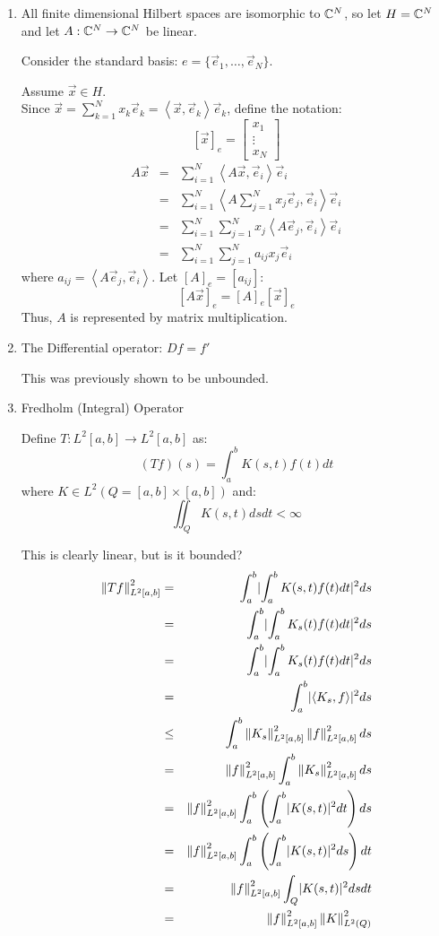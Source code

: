 \documentclass[letterpaper,12pt,fleqn]{article}
\newcommand{\ve}{\vec{e}}
\newcommand{\vx}{\vec{x}}
\newcommand{\norm}[1]{\left\|#1\right\|}
\newcommand{\inner}[1]{\left<#1\right>}
\begin{document}
\begin{examples}
  \listbreak
  \begin{enumerate}
  \item All finite dimensional Hilbert spaces are isomorphic to $\mathbb{C}^N$, so
    let $H=\mathbb{C}^N$ and let $A:\mathbb{C}^N\to\mathbb{C}^N$ be linear.

    Consider the standard basis: $e=\{\ve_1,\ldots,\ve_N\}$.

    Assume $\vx\in H$. \\
    Since $\vx=\sum_{k=1}^Nx_k\ve_k=\inner{\vx,\ve_k}\ve_k$, define the notation:
    \[[\vx]_e=\begin{bmatrix} x_1 \\ \vdots \\ x_N \end{bmatrix}\]
    \begin{eqnarray*}
      A\vx &=& \sum_{i=1}^N\inner{A\vx,\ve_i}\ve_i \\
      &=& \sum_{i=1}^N\inner{A\sum_{j=1}^Nx_j\ve_j,\ve_i}\ve_i \\
      &=& \sum_{i=1}^N\sum_{j=1}^Nx_j\inner{A\ve_j,\ve_i}\ve_i \\
      &=& \sum_{i=1}^N\sum_{j=1}^Na_{ij}x_j\ve_i
    \end{eqnarray*}
    where $a_{ij}=\inner{A\ve_j,\ve_i}$.
    Let $[A]_e=[a_{ij}]$:
    \[[A\vx]_e=[A]_e[\vx]_e\]
    Thus, $A$ is represented by matrix multiplication.

  \item The Differential operator: $Df=f'$

    This was previously shown to be unbounded.

  \item Fredholm (Integral) Operator

    Define $T:L^2[a,b]\to L^2[a,b]$ as:
    \[(Tf)(s)=\int_a^bK(s,t)f(t)dt\]
    where $K\in L^2(Q=[a,b]\times[a,b])$ and:
    \[\iint_QK(s,t)ds dt<\infty\]

    This is clearly linear, but is it bounded?
    \begin{eqnarray*}
      \norm{Tf}_{L^2[a,b]}^2 &=& \int_a^b\abs{\int_a^bK(s,t)f(t)dt}^2ds \\
      &=& \int_a^b\abs{\int_a^bK_s(t)f(t)dt}^2ds \\
      &=& \int_a^b\abs{\int_a^bK_s(t)f(t)dt}^2ds \\
      &=& \int_a^b\abs{\inner{K_s,f}}^2ds \\
      &\le& \int_a^b\norm{K_s}_{L^2[a,b]}^2\norm{f}_{L^2[a,b]}^2ds \\
      &=& \norm{f}_{L^2[a,b]}^2\int_a^b\norm{K_s}_{L^2[a,b]}^2ds \\
      &=& \norm{f}_{L^2[a,b]}^2\int_a^b\left(\int_a^b\abs{K(s,t)}^2dt\right)ds \\
      &=& \norm{f}_{L^2[a,b]}^2\int_a^b\left(\int_a^b\abs{K(s,t)}^2ds\right)dt \\
      &=& \norm{f}_{L^2[a,b]}^2\int_Q\abs{K(s,t)}^2ds dt \\
      &=& \norm{f}_{L^2[a,b]}^2\norm{K}_{L^2(Q)}^2
    \end{eqnarray*}


\end{enumerate}
\end{examples}
\end{document}
